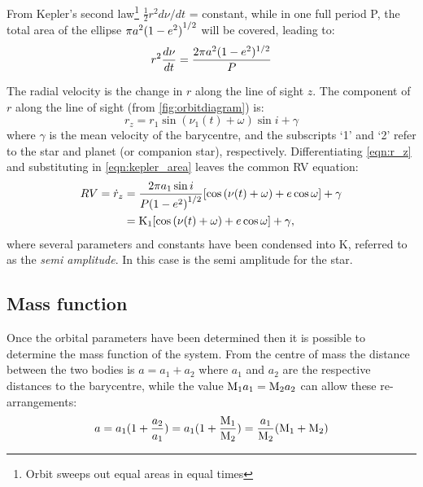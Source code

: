 From Kepler's second law\footnote{Orbit sweeps out equal areas in equal times} \(\frac{1}{2} r^{2} d\nu/dt\) = constant, while in one full period P, the total area of the ellipse \(\pi a^{2}{(1 - {e}^{2})}^{1/2} \) will be covered, leading to:
\begin{equation}
    r^{2} \frac{d\nu}{dt} = \frac{2\pi a^{2}(1 - {e}^{2})^{1/2}}{P} \label{eqn:kepler_area}
\end{equation}

The radial velocity is the change in $r$ along the line of sight $z$.
The component of $r$ along the line of sight (from \cref{fig:orbitdiagram}) is:
\begin{equation}
    r_z =  r_1 \sin{(\nu_1(t) + \omega)}\sin{i} + \gamma \label{eqn:r_z}
\end{equation}
where $\gamma$ is the mean velocity of the barycentre, and the subscripts `1' and `2' refer to the star and planet (or companion star), respectively.
Differentiating \cref{eqn:r_z} and substituting in \cref{eqn:kepler_area} leaves the common RV equation:
\begin{align}
    {RV} = \dot{r}_z &= \frac{2 \pi a_1 \sin{i}}{P{(1 - {e}^{2})}^{1/2}} [\cos{(\nu(t) + \omega)} + e\cos{\omega}] + \gamma  \label{eqn:rv_equation} \\
     &= \textrm{K}_{1} [\cos{(\nu(t) + \omega)} + e\cos{\omega}] + \gamma,
\end{align}
where several parameters and constants have been condensed into $\textrm{K}$, referred to as the \emph{semi amplitude}.
In this case \Kone{} is the semi amplitude for the star.


\subsection{Mass function}
Once the orbital parameters have been determined then it is possible to determine the mass function of the system.
From the centre of mass the distance between the two bodies is \(a = a_1 + a_2\) where $a_1$ and $a_2$ are the respective distances to the barycentre, while the value \(\textrm{M}_{1} a_1 = \textrm{M}_{2} a_2\) can allow these re-arrangements:
\begin{equation}
    a = a_{1} (1 + \frac{a_{2}}{a_{1}}) = a_{1}(1 + \frac{\textrm{M}_{1}}{\textrm{M}_{2}}) = \frac{a_{1}}{\textrm{M}_{2}} (\textrm{M}_{1} + \textrm{M}_{2})
\end{equation}

